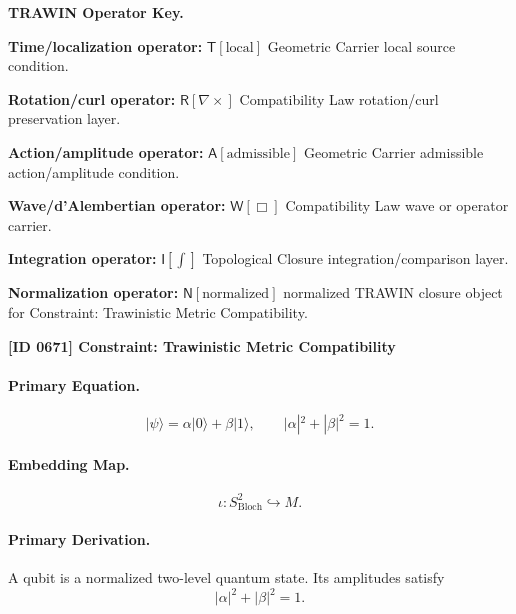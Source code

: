 \par\vspace{0.45\baselineskip}
\noindent\begin{minipage}[t]{\linewidth}
\begingroup
\small
\raggedright
\textbf{TRAWIN Operator Key.}\par
\noindent\textbf{Time/localization operator:} $\mathsf{T}\!\left[\mathrm{local}\right]$ Geometric Carrier local source condition.\par
\noindent\textbf{Rotation/curl operator:} $\mathsf{R}\!\left[\nabla\times\right]$ Compatibility Law rotation/curl preservation layer.\par
\noindent\textbf{Action/amplitude operator:} $\mathsf{A}\!\left[\mathrm{admissible}\right]$ Geometric Carrier admissible action/amplitude condition.\par
\noindent\textbf{Wave/d'Alembertian operator:} $\mathsf{W}\!\left[\Box\right]$ Compatibility Law wave or operator carrier.\par
\noindent\textbf{Integration operator:} $\mathsf{I}\!\left[\int\right]$ Topological Closure integration/comparison layer.\par
\noindent\textbf{Normalization operator:} $\mathsf{N}\!\left[\mathrm{normalized}\right]$ normalized TRAWIN closure object for Constraint: Trawinistic Metric Compatibility.\par
\endgroup
\end{minipage}

\clearpage
\noindent\textbf{[ID 0671] Constraint: Trawinistic Metric Compatibility}\par
\vspace{0.35em}
\paragraph{Primary Equation.}
\begin{equation}
|\psi\rangle = \alpha|0\rangle+\beta|1\rangle,
\qquad
|\alpha|^2+|\beta|^2=1 .
\end{equation}

\paragraph{Embedding Map.}
\begin{equation}
\iota:S^2_{\mathrm{Bloch}}\hookrightarrow M .
\end{equation}

\paragraph{Primary Derivation.}
A qubit is a normalized two-level quantum state. Its amplitudes satisfy
\begin{equation}
|\alpha|^2+|\beta|^2=1 .
\end{equation}

